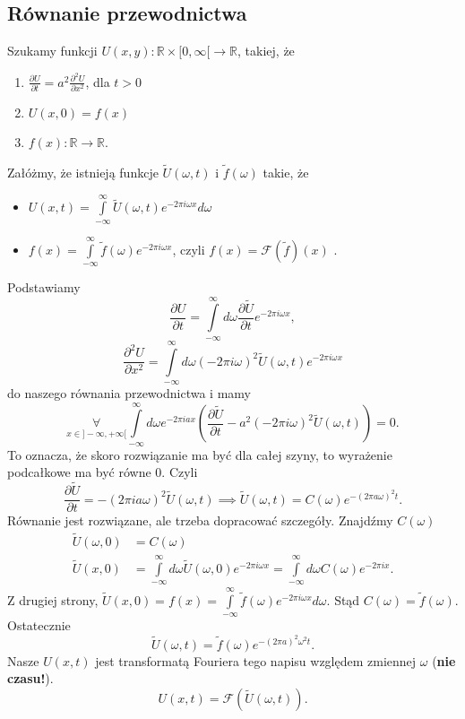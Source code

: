 \documentclass[../main.tex]{subfiles}
\begin{document}
\subsection{Równanie przewodnictwa}
Szukamy funkcji $U(x,y): \mathbb{R}\times [0,\infty[ \to \mathbb{R}$, takiej, że
\begin{enumerate}
    \item $\frac{\partial U}{\partial t} = a^2 \frac{\partial^2 U}{\partial x^2}$, dla $t > 0$
    \item $U(x,0) = f(x)$
    \item $f(x): \mathbb{R}\to \mathbb{R}$.
\end{enumerate}
Załóżmy, że istnieją funkcje $\tilde U(\omega, t)$ i $\tilde f(\omega)$ takie, że
\begin{itemize}
    \item $U(x,t) = \int\limits_{-\infty}^{\infty}\tilde U(\omega, t)e^{-2\pi i \omega x}d\omega$
    \item $ f(x) = \int\limits_{-\infty}^{\infty} \tilde f(\omega)e^{-2\pi i \omega x}$, czyli $f(x) = \mathcal{F}\left( \tilde f \right) (x)$
.\end{itemize}
Podstawiamy
\[
    \frac{\partial U}{\partial t} = \int\limits_{-\infty}^{\infty} d\omega \frac{\partial \tilde U}{\partial t}  e^{-2\pi i \omega x}
,\]
\[
    \frac{\partial^2 U}{\partial x^2} = \int\limits_{-\infty}^{\infty} d\omega \left( -2 \pi i \omega \right)^2 \tilde U (\omega, t)e^{-2\pi i \omega x}
\]
do naszego równania przewodnictwa i mamy
\[
    \underset{x\in ]-\infty, +\infty[}{\forall} \int\limits_{-\infty}^{\infty} d\omega e^{-2 \pi i a x}\left( \frac{\partial \tilde U}{\partial t} - a^2\left( -2\pi i \omega \right)^2 \tilde U(\omega, t)\right) = 0
.\]
To oznacza, że skoro rozwiązanie ma być dla całej szyny, to wyrażenie podcałkowe ma być równe $0$. Czyli
\[
    \frac{\partial \tilde U}{\partial t}  = -(2\pi i a \omega)^2 \tilde U(\omega, t) \implies \tilde U(\omega, t) = C(\omega) e^{-\left( 2 \pi a \omega \right)^2 t}
.\]
Równanie jest rozwiązane, ale trzeba dopracować szczegóły. Znajdźmy $C(\omega)$
\begin{align*}
    \tilde U(\omega, 0) &= C(\omega)\\
    \tilde U(x,0) &= \int\limits_{-\infty}^{\infty} d\omega \tilde U (\omega, 0)e^{-2 \pi i \omega x} = \int\limits_{-\infty}^{\infty} d\omega C(\omega) e^{-2\pi i x}
.\end{align*}
Z drugiej strony, $\tilde U(x,0) = f(x) = \int\limits_{-\infty}^{\infty} \tilde f(\omega)e^{-2\pi i\omega x}d\omega$.
Stąd $C(\omega) = \tilde f(\omega)$. Ostatecznie
\[
    \tilde U(\omega, t) = \tilde f(\omega) e^{-(2\pi a)^2\omega^2 t}
.\]
Nasze $U(x,t)$ jest transformatą Fouriera tego napisu względem zmiennej $\omega$ (\textbf{nie czasu!}).
 \[
     U(x,t) = \mathcal{F}\left( \tilde U(\omega, t) \right)
.\]
\end{document}
